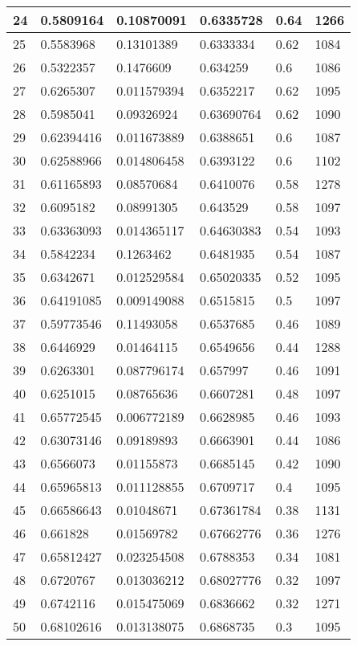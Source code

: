 \begin{longtable}{|l|l|l|l|l|l|}
24 & 0.5809164 & 0.10870091 & 0.6335728 & 0.64 & 1266 \\ \hline 
25 & 0.5583968 & 0.13101389 & 0.6333334 & 0.62 & 1084 \\ \hline 
26 & 0.5322357 & 0.1476609 & 0.634259 & 0.6 & 1086 \\ \hline 
27 & 0.6265307 & 0.011579394 & 0.6352217 & 0.62 & 1095 \\ \hline 
28 & 0.5985041 & 0.09326924 & 0.63690764 & 0.62 & 1090 \\ \hline 
29 & 0.62394416 & 0.011673889 & 0.6388651 & 0.6 & 1087 \\ \hline 
30 & 0.62588966 & 0.014806458 & 0.6393122 & 0.6 & 1102 \\ \hline 
31 & 0.61165893 & 0.08570684 & 0.6410076 & 0.58 & 1278 \\ \hline 
32 & 0.6095182 & 0.08991305 & 0.643529 & 0.58 & 1097 \\ \hline 
33 & 0.63363093 & 0.014365117 & 0.64630383 & 0.54 & 1093 \\ \hline 
34 & 0.5842234 & 0.1263462 & 0.6481935 & 0.54 & 1087 \\ \hline 
35 & 0.6342671 & 0.012529584 & 0.65020335 & 0.52 & 1095 \\ \hline 
36 & 0.64191085 & 0.009149088 & 0.6515815 & 0.5 & 1097 \\ \hline 
37 & 0.59773546 & 0.11493058 & 0.6537685 & 0.46 & 1089 \\ \hline 
38 & 0.6446929 & 0.01464115 & 0.6549656 & 0.44 & 1288 \\ \hline 
39 & 0.6263301 & 0.087796174 & 0.657997 & 0.46 & 1091 \\ \hline 
40 & 0.6251015 & 0.08765636 & 0.6607281 & 0.48 & 1097 \\ \hline 
41 & 0.65772545 & 0.006772189 & 0.6628985 & 0.46 & 1093 \\ \hline 
42 & 0.63073146 & 0.09189893 & 0.6663901 & 0.44 & 1086 \\ \hline 
43 & 0.6566073 & 0.01155873 & 0.6685145 & 0.42 & 1090 \\ \hline 
44 & 0.65965813 & 0.011128855 & 0.6709717 & 0.4 & 1095 \\ \hline 
45 & 0.66586643 & 0.01048671 & 0.67361784 & 0.38 & 1131 \\ \hline 
46 & 0.661828 & 0.01569782 & 0.67662776 & 0.36 & 1276 \\ \hline 
47 & 0.65812427 & 0.023254508 & 0.6788353 & 0.34 & 1081 \\ \hline 
48 & 0.6720767 & 0.013036212 & 0.68027776 & 0.32 & 1097 \\ \hline 
49 & 0.6742116 & 0.015475069 & 0.6836662 & 0.32 & 1271 \\ \hline 
50 & 0.68102616 & 0.013138075 & 0.6868735 & 0.3 & 1095 \\ \hline 
\end{longtable}